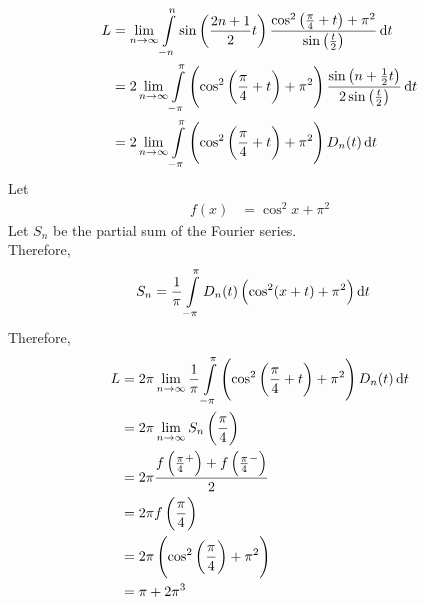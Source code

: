 \documentclass[fleqn, a4paper, 12pt, twoside]{article}
\theoremstyle{definition}
\theoremstyle{theorem}
\begin{document}
\begin{solution}
	\begin{align*}
		L & = \lim\limits_{n \to \infty} \int\limits_{-n}^{n} \sin\left( \frac{2 n + 1}{2} t \right) \frac{\cos^2\left( \frac{\pi}{4} + t \right) + \pi^2}{\sin\left( \frac{t}{2} \right)} \dif t                      \\
                  & = 2 \lim\limits_{n \to \infty} \int\limits_{-\pi}^{\pi} \left( \cos^2\left( \frac{\pi}{4} + t \right) + \pi^2 \right) \frac{\sin\left( n + \frac{1}{2} t \right)}{2 \sin\left( \frac{t}{2} \right)} \dif t \\
                  & = 2 \lim\limits_{n \to \infty} \int\limits_{-\pi}^{\pi} \left( \cos^2\left( \frac{\pi}{4} + t \right) + \pi^2 \right) D_n(t) \dif t
	\end{align*}
	Let
	\begin{align*}
		f(x) & = \cos^2 x + \pi^2
	\end{align*}
	Let $S_n$ be the partial sum of the Fourier series.\\
	Therefore,
	\begin{align*}
		S_n & = \frac{1}{\pi} \int\limits_{-\pi}^{\pi} D_n(t) \left( \cos^2(x + t) + \pi^2 \right) \dif t
	\end{align*}
	Therefore,
	\begin{align*}
		L & = 2 \pi \lim\limits_{n \to \infty} \frac{1}{\pi} \int\limits_{-\pi}^{\pi} \left( \cos^2\left( \frac{\pi}{4} + t \right) + \pi^2 \right) D_n(t) \dif t \\
                  & = 2 \pi \lim\limits_{n \to \infty} S_n\left( \frac{\pi}{4} \right)                                                                                    \\
                  & = 2 \pi \frac{f\left( {\frac{\pi}{4}}^+ \right) + f\left( {\frac{\pi}{4}}^- \right)}{2}                                                               \\
                  & = 2 \pi f\left( \frac{\pi}{4} \right)                                                                                                                 \\
                  & = 2 \pi \left( \cos^2\left( \frac{\pi}{4} \right) + \pi^2 \right)                                                                                     \\
                  & = \pi + 2 \pi^3
	\end{align*}
\end{solution}
\end{document}
